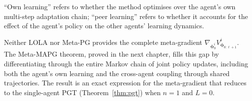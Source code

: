 \medskip\noindent ``Own learning'' refers to whether the method optimises over the agent's own multi-step adaptation chain; ``peer learning'' refers to whether it accounts for the effect of the agent's policy on the other agents' learning dynamics.

Neither LOLA nor Meta-PG provides the complete meta-gradient $\nabla_{\bm{\phi}_0^i} V^i_{\bm{\phi}_{0:\ell+1}}$. The Meta-MAPG theorem, proved in the next chapter, fills this gap by differentiating through the entire Markov chain of joint policy updates, including both the agent's own learning and the cross-agent coupling through shared trajectories. The result is an exact expression for the meta-gradient that reduces to the single-agent PGT (Theorem~\ref{thm:pgt}) when $n=1$ and $L=0$.
